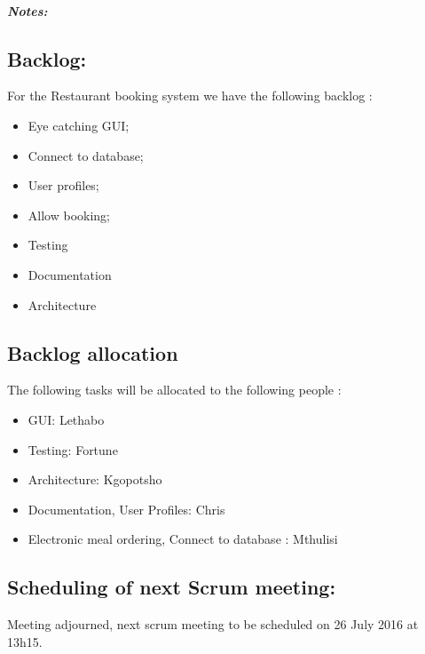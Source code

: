 \documentclass{article}
\begin{document}
\subparagraph{Notes:\\}

\subsection{Backlog: }
For the Restaurant booking system we have the following backlog :\\  
\begin{itemize}
	\item Eye catching GUI;
	\item Connect to database;
	\item User profiles;
	\item Allow booking;
	\item Testing
	\item Documentation
	\item Architecture
\end{itemize}

\subsection{Backlog allocation}
The following tasks will be allocated to the following people :\\
\begin{itemize}
	\item GUI: Lethabo
	\item Testing: Fortune
	\item Architecture: Kgopotsho
	\item Documentation, User Profiles: Chris 
	\item Electronic meal ordering, Connect to database : Mthulisi
\end{itemize}

\subsection{Scheduling of next Scrum meeting:}
Meeting adjourned, next scrum meeting to be scheduled on 26 July 2016 at 13h15. \\
\end{document}
